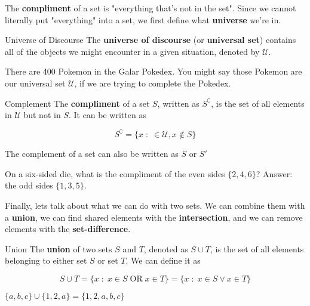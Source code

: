 The {\bf compliment} of a set is "everything that's not in the set". Since we cannot literally put "everything" into a set, we first define what {\bf universe} we're in. 

\begin{boxdefine}{Universe of Discourse}{}
	The {\bf universe of discourse} (or {\bf universal set}) contains all of the objects we might encounter in a given situation, denoted by $\mathcal{U}$.
\end{boxdefine}

\begin{boxexample}{}{}
	There are 400 Pokemon in the Galar Pokedex. You might say those Pokemon are our universal set $\mathcal{U}$, if we are trying to complete the Pokedex.
\end{boxexample}

\begin{boxdefine}{Complement}{}
	The {\bf compliment} of a set $S$, written as $S^\complement$, is the set of all elements in $\mathcal{U}$ but not in $S$. It can be written as

	\[
		S^\complement = \{x \;:\; \in \mathcal{U}, x \notin S\}
	\]
\end{boxdefine}

\begin{boxnotation*}{}{}
	The complement of a set can also be written as $\overline{S}$ or $S'$
\end{boxnotation*}

\begin{boxexample}{}{}
	On a six-sided die, what is the compliment of the even sides $\{2,4,6\}$? Answer: the odd sides $\{1,3,5\}$.
\end{boxexample}

Finally, lets talk about what we can do with two sets. We can combine them with a {\bf union}, we can find shared elements with the {\bf intersection}, and we can remove elements with the {\bf set-difference}.

\begin{boxdefine}{Union}{}
	The {\bf union} of two sets $S$ and $T$, denoted as $S \cup T$, is the set of all elements belonging to either set $S$ or set $T$. We can define it as

	\[
		S \cup T = \{x \;:\; x \in S \;\text{OR}\; x \in T \} = \{x \;:\; x \in S \lor x \in T \}
	\]
\end{boxdefine}

\begin{boxexample}{}{}
	$\{a,b,c\} \cup \{1,2,a\} = \{1,2,a,b,c\}$
\end{boxexample}

